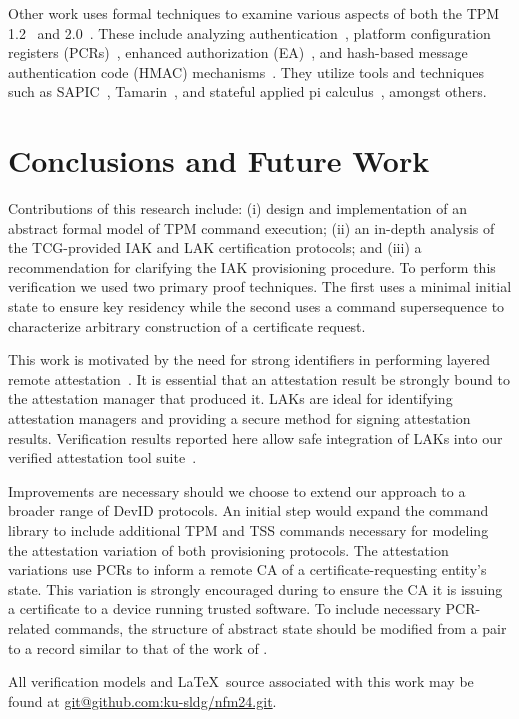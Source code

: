 \documentclass[runningheads]{llncs}
\begin{document}
Other work uses formal techniques to examine various aspects of both
the TPM 1.2~\citep{AuthAnalysis,PCRAnalysis} and
2.0~\citep{EAAnalysis,HMACAnalysis}.  These include analyzing
authentication~\citep{AuthAnalysis}, platform configuration registers
(PCRs)~\citep{PCRAnalysis}, enhanced authorization
(EA)~\citep{EAAnalysis}, and hash-based message authentication code
(HMAC) mechanisms~\citep{HMACAnalysis}. They utilize tools and
techniques such as SAPIC~\citep{kremer2016automated},
Tamarin~\citep{meier2013tamarin}, and stateful applied pi
calculus~\citep{Milner:99:Communicating-a}, amongst others.
% 
%
%
\section{Conclusions and Future Work}

Contributions of this research include: (i) design and implementation
of an abstract formal model of TPM command execution; (ii) an in-depth
analysis of the TCG-provided IAK and LAK certification protocols;
and (iii) a recommendation for clarifying the IAK provisioning
procedure.  To perform this verification we used two primary proof
techniques.  The first uses a minimal initial state to ensure key
residency while the second uses a command supersequence to characterize
arbitrary construction of a certificate request.

This work is motivated by the need for strong identifiers in
performing layered remote
attestation~\cite{Coker::Principles-of-R,Ramsdell:2019aa}.
It is essential that an attestation result be strongly bound to the
attestation manager that produced it. LAKs are ideal for identifying
attestation managers and providing a secure method for signing
attestation results.  Verification results reported here allow safe
integration of LAKs into our verified attestation tool
suite~\cite{petz2022innovations}.

Improvements are necessary should we choose to extend our approach to
a broader range of DevID protocols.  An initial step would expand the
command library to include additional TPM and TSS commands necessary
for modeling the attestation variation of both provisioning
protocols. The attestation variations use PCRs to inform a remote CA
of a certificate-requesting entity's state. This variation is strongly
encouraged during to ensure the CA it is issuing a certificate to a
device running trusted software. To include necessary PCR-related
commands, the structure of abstract state should be modified from a
pair to a record similar to that of the work of
\citet{PrivacyCAAnalysis-Hall}.

\medskip

\noindent All verification models and \LaTeX\ source associated with
this work may be found at \url{git@github.com:ku-sldg/nfm24.git}.

% 
% 
%
%
%

%

%
\end{document}
